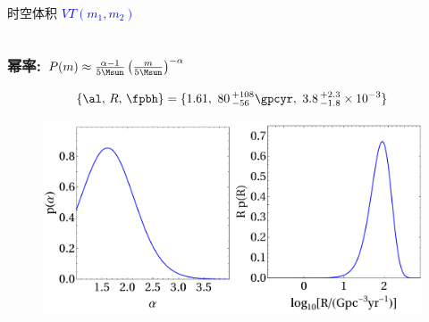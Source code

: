 \documentclass[xcolor={svgnames},compress]{beamer}
\def\({\left(}
\def\){\right)}
\def\({\left(}
\def\){\right)}
\begin{document}
\begin{frame}
\begin{columns}
\begin{column}{0.58\textwidth}
\begin{figure}[htbp!]
            \end{figure}			
            \vspace{-1.5mm}
            \centering
            时空体积 \textcolor{blue}{$VT(m_1,m_2)$}
        \end{column}
    \end{columns}
\end{frame}
\begin{frame}
    \frametitle{幂率: $P(m)\approx {\alpha-1\over 5\Msun} \({m\over 5\Msun}\)^{-\alpha}$}
    \begin{block}{}\small{
            \[ 
            \{\al,\, R,\, \fpbh\} = \{1.61,\ 80\,^{+108}_{-56} \gpcyr,\
            3.8\,^{+2.3}_{-1.8} \times 10^{-3}\}
            \] 
        }\vspace{-4mm} 
    \end{block} 
    \begin{figure}[htbp!]
        \centering
        \includegraphics[width = \textwidth]{./pic/posterior-PBH-power.pdf}
    \end{figure}
\end{frame}
\end{document}

